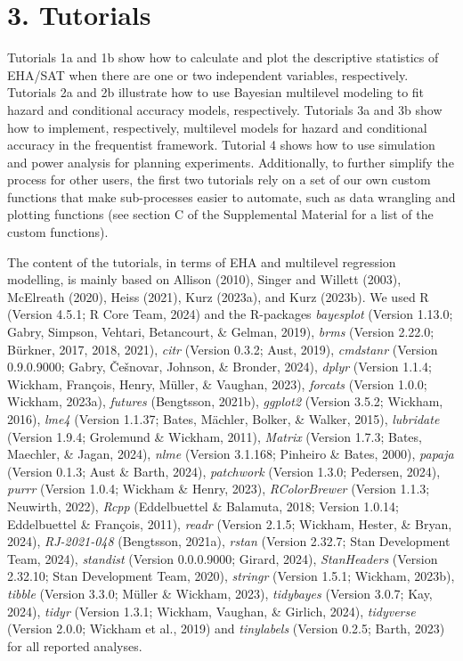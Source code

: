 \documentclass[
  man, donotrepeattitle,floatsintext]{apa6}
\begin{document}
\section{3. Tutorials}\label{tutorials}

Tutorials 1a and 1b show how to calculate and plot the descriptive statistics of EHA/SAT when there are one or two independent variables, respectively. Tutorials 2a and 2b illustrate how to use Bayesian multilevel modeling to fit hazard and conditional accuracy models, respectively. Tutorials 3a and 3b show how to implement, respectively, multilevel models for hazard and conditional accuracy in the frequentist framework. Tutorial 4 shows how to use simulation and power analysis for planning experiments.
Additionally, to further simplify the process for other users, the first two tutorials rely on a set of our own custom functions that make sub-processes easier to automate, such as data wrangling and plotting functions (see section C of the Supplemental Material for a list of the custom functions).

The content of the tutorials, in terms of EHA and multilevel regression modelling, is mainly based on Allison (2010), Singer and Willett (2003), McElreath (2020), Heiss (2021), Kurz (2023a), and Kurz (2023b). We used R (Version 4.5.1; R Core Team, 2024) and the R-packages \emph{bayesplot} (Version 1.13.0; Gabry, Simpson, Vehtari, Betancourt, \& Gelman, 2019), \emph{brms} (Version 2.22.0; Bürkner, 2017, 2018, 2021), \emph{citr} (Version 0.3.2; Aust, 2019), \emph{cmdstanr} (Version 0.9.0.9000; Gabry, Češnovar, Johnson, \& Bronder, 2024), \emph{dplyr} (Version 1.1.4; Wickham, François, Henry, Müller, \& Vaughan, 2023), \emph{forcats} (Version 1.0.0; Wickham, 2023a), \emph{futures} (Bengtsson, 2021b), \emph{ggplot2} (Version 3.5.2; Wickham, 2016), \emph{lme4} (Version 1.1.37; Bates, Mächler, Bolker, \& Walker, 2015), \emph{lubridate} (Version 1.9.4; Grolemund \& Wickham, 2011), \emph{Matrix} (Version 1.7.3; Bates, Maechler, \& Jagan, 2024), \emph{nlme} (Version 3.1.168; Pinheiro \& Bates, 2000), \emph{papaja} (Version 0.1.3; Aust \& Barth, 2024), \emph{patchwork} (Version 1.3.0; Pedersen, 2024), \emph{purrr} (Version 1.0.4; Wickham \& Henry, 2023), \emph{RColorBrewer} (Version 1.1.3; Neuwirth, 2022), \emph{Rcpp} (Eddelbuettel \& Balamuta, 2018; Version 1.0.14; Eddelbuettel \& François, 2011), \emph{readr} (Version 2.1.5; Wickham, Hester, \& Bryan, 2024), \emph{RJ-2021-048} (Bengtsson, 2021a), \emph{rstan} (Version 2.32.7; Stan Development Team, 2024), \emph{standist} (Version 0.0.0.9000; Girard, 2024), \emph{StanHeaders} (Version 2.32.10; Stan Development Team, 2020), \emph{stringr} (Version 1.5.1; Wickham, 2023b), \emph{tibble} (Version 3.3.0; Müller \& Wickham, 2023), \emph{tidybayes} (Version 3.0.7; Kay, 2024), \emph{tidyr} (Version 1.3.1; Wickham, Vaughan, \& Girlich, 2024), \emph{tidyverse} (Version 2.0.0; Wickham et al., 2019) and \emph{tinylabels} (Version 0.2.5; Barth, 2023) for all reported analyses.
\end{document}
